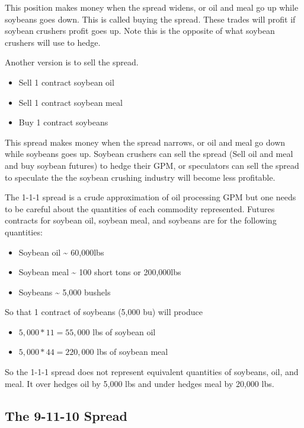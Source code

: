 \documentclass[
]{book}
\providecommand{\tightlist}{%
  \setlength{\itemsep}{0pt}\setlength{\parskip}{0pt}}
\begin{document}
This position makes money when the spread widens, or oil and meal go up while soybeans goes down. This is called buying the spread. These trades will profit if soybean crushers profit goes up. Note this is the opposite of what soybean crushers will use to hedge.

Another version is to sell the spread.

\begin{itemize}
\tightlist
\item
  Sell 1 contract soybean oil
\item
  Sell 1 contract soybean meal
\item
  Buy 1 contract soybeans
\end{itemize}

This spread makes money when the spread narrows, or oil and meal go down while soybeans goes up. Soybean crushers can sell the spread (Sell oil and meal and buy soybean futures) to hedge their GPM, or speculators can sell the spread to speculate the the soybean crushing industry will become less profitable.

The 1-1-1 spread is a crude approximation of oil processing GPM but one needs to be careful about the quantities of each commodity represented. Futures contracts for soybean oil, soybean meal, and soybeans are for the following quantities:

\begin{itemize}
\tightlist
\item
  Soybean oil \textasciitilde{} 60,000lbs
\item
  Soybean meal \textasciitilde{} 100 short tons or 200,000lbs
\item
  Soybeans \textasciitilde{} 5,000 bushels
\end{itemize}

So that 1 contract of soybeans (5,000 bu) will produce

\begin{itemize}
\tightlist
\item
  \(5,000*11 = 55,000\) lbs of soybean oil
\item
  \(5,000*44 = 220,000\) lbs of soybean meal
\end{itemize}

So the 1-1-1 spread does not represent equivalent quantities of soybeans, oil, and meal. It over hedges oil by 5,000 lbs and under hedges meal by 20,000 lbs.

\hypertarget{the-9-11-10-spread}{%
\subsection{The 9-11-10 Spread}\label{the-9-11-10-spread}}
\end{document}
